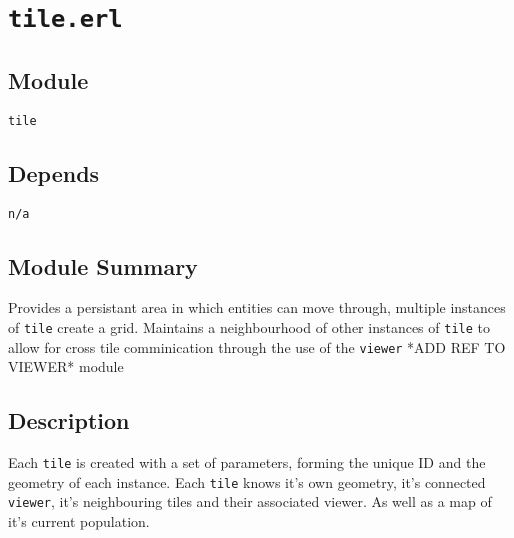\pagestyle{empty}
\section{\tt tile.erl}
\subsection{Module}
\verb+tile+
\subsection{Depends}
{\tt n/a}
\subsection{Module Summary}
Provides a persistant area in which entities can move through, multiple instances of \verb+tile+ create a grid.
Maintains a neighbourhood of other instances of \verb+tile+ to allow for cross tile comminication through the use of the \verb+viewer+ *ADD REF TO VIEWER* module
\subsection{Description}
Each \verb+tile+ is created with a set of parameters, forming the unique ID and the geometry of each instance.
Each \verb+tile+ knows it's own geometry, it's connected \verb+viewer+, it's neighbouring tiles and their associated viewer. As well as a map of it's current population.
